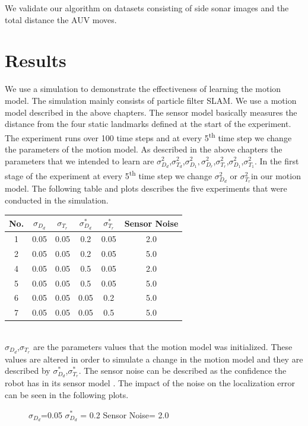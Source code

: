 \documentclass[12pt]{dalcsthesis}
\begin{document}
{We validate our algorithm on datasets consisting of side sonar images
and the total distance the AUV moves. 

\section{Results}
We use a simulation to demonstrate the effectiveness of learning the
motion model. The simulation mainly consists of particle filter SLAM.
We use a motion model described in the above chapters. The sensor
model basically measures the distance from the four static landmarks
defined at the start of the experiment. The experiment runs over 100
time steps and at every 5\textsuperscript{th} time step we change
the parameters of the motion model. As described in the above chapters
the parameters that we intended to learn are $\sigma_{D_{d}}^{2}$,$\sigma_{T_{d}}^{2}$,$\sigma_{D_{1}}^{2},\sigma_{D_{r}}^{2}$,$\sigma_{T_{r}}^{2}$,$\sigma_{D_{1}}^{2}$,$\sigma_{T_{1}}^{2}$.
In the first stage of the experiment at every 5\textsuperscript{th }time step
we change $\sigma_{D_{d}}^{2}$ or $\sigma_{T_{r}}^{2}$in our motion
model. The following table and plots describes the five experiments
that were conducted in the simulation.

\begin{tabular}{|c|c|c|c|c|c|}
\hline 
No. & $\sigma_{D_{d}}$ & $\sigma_{T_{r}}$ & $\sigma_{D_{d}}^{*}$ & $\sigma_{T_{r}}^{*}$ & Sensor Noise\tabularnewline
\hline 
\hline 
1 & 0.05 & 0.05 & 0.2 & 0.05 & 2.0\tabularnewline
\hline 
2 & 0.05 & 0.05 & 0.2 & 0.05 & 5.0\tabularnewline
\hline 
4 & 0.05 & 0.05 & 0.5 & 0.05 & 2.0\tabularnewline
\hline 
5 & 0.05 & 0.05 & 0.5 & 0.05 & 5.0\tabularnewline
\hline 
6 & 0.05 & 0.05 & 0.05 & 0.2 & 5.0\tabularnewline
\hline 
7 & 0.05 & 0.05 & 0.05 & 0.5 & 5.0\tabularnewline
\hline 
\end{tabular}
\\

$\sigma_{D_{d}}$,$\sigma_{T_{r}}$ are the parameters values that
the motion model was initialized. These values are altered in order
to simulate a change in the motion model and they are described by
$\sigma_{D_{d}}^{*}$,$\sigma_{T_{r}}^{*}$. The sensor noise can
be described as the confidence the robot has in its sensor model .
The impact of the noise on the localization error can be seen in the
following plots.

\begin{figure}
\caption{$\sigma_{D_{d}}$=0.05 $\sigma_{D_{d}}^{*}$ = 0.2 Sensor Noise= 2.0}



\end{figure}}
\end{document}
